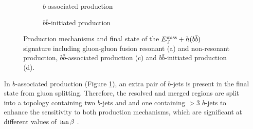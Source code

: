 \begin{figure}[h!]
\begin{subfigure}[b]{0.49\textwidth}
        \caption{$b$-associated production}
        \label{subfig:hbb-bb-associated}
    \end{subfigure}
    \begin{subfigure}[b]{0.49\textwidth}
        \centering
        \vspace{1.0cm}
        \caption{$b\bar{b}$-initiated production}
        \label{subfig:hbb-bb-initiated}
    \end{subfigure}
    \caption{Production mechanisms and final state of the $E_{\mathrm{T}}^{\mathrm{miss}}+h(b\bar{b})$ signature including gluon-gluon fusion resonant (a) and non-resonant production, $b\bar{b}$-associated production (c) and $b\bar{b}$-initiated production (d).}
    \label{fig:hbb-signature}
\end{figure} 

In $b$-associated production (Figure \ref{subfig:hbb-bb-associated}), an extra pair of $b$-jets is present in the final state from gluon splitting. Therefore, the resolved and merged regions are split into a topology containing two $b$-jets and and one containing $>3$ $b$-jets to enhance the sensitivity to both production mechanisms, which are significant at different values of $\tan\beta~$.


